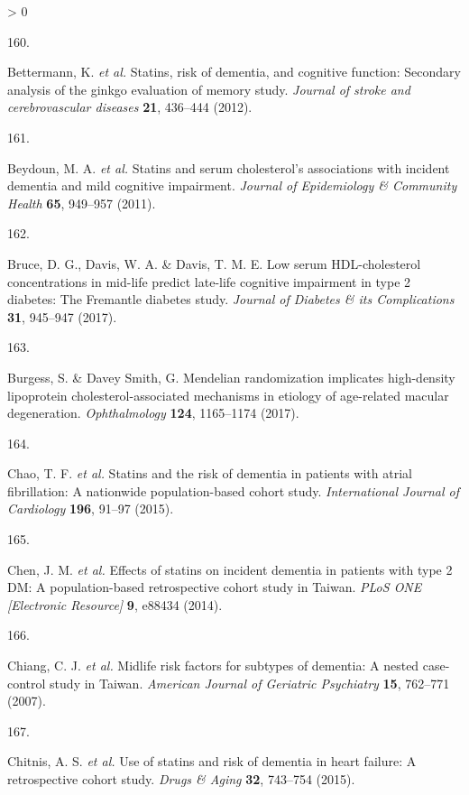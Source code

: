 \documentclass[a4paper, twoside]{templates/ociamthesis}
\newlength{\cslhangindent}
\newlength{\csllabelwidth}
\newenvironment{CSLReferences}[3] %
 {%
  \setlength{\parindent}{0pt}
  \ifodd #1 \everypar{\setlength{\hangindent}{\cslhangindent}}\ignorespaces\fi
  \ifnum #2 > 0
  \setlength{\parskip}{#2\baselineskip}
  \fi
 }%
 {}
\newcommand{\CSLLeftMargin}[1]{\parbox[t]{\maxof{\widthof{#1}}{\csllabelwidth}}{#1}}
\newcommand{\CSLRightInline}[1]{\parbox[t]{\linewidth - \csllabelwidth}{#1}}
\begin{document}
\begin{CSLReferences}{0}{0}
\leavevmode\hypertarget{ref-bettermann2012a}{}%
\CSLLeftMargin{160. }
\CSLRightInline{Bettermann, K. \emph{et al.} Statins, risk of dementia, and cognitive function: Secondary analysis of the ginkgo evaluation of memory study. \emph{Journal of stroke and cerebrovascular diseases} \textbf{21}, 436--444 (2012).}

\leavevmode\hypertarget{ref-beydoun2011}{}%
\CSLLeftMargin{161. }
\CSLRightInline{Beydoun, M. A. \emph{et al.} Statins and serum cholesterol's associations with incident dementia and mild cognitive impairment. \emph{Journal of Epidemiology \& Community Health} \textbf{65}, 949--957 (2011).}

\leavevmode\hypertarget{ref-bruce2017}{}%
\CSLLeftMargin{162. }
\CSLRightInline{Bruce, D. G., Davis, W. A. \& Davis, T. M. E. Low serum {HDL}-cholesterol concentrations in mid-life predict late-life cognitive impairment in type 2 diabetes: {The Fremantle} diabetes study. \emph{Journal of Diabetes \& its Complications} \textbf{31}, 945--947 (2017).}

\leavevmode\hypertarget{ref-burgess2017}{}%
\CSLLeftMargin{163. }
\CSLRightInline{Burgess, S. \& Davey Smith, G. Mendelian randomization implicates high-density lipoprotein cholesterol-associated mechanisms in etiology of age-related macular degeneration. \emph{Ophthalmology} \textbf{124}, 1165--1174 (2017).}

\leavevmode\hypertarget{ref-chao2015a}{}%
\CSLLeftMargin{164. }
\CSLRightInline{Chao, T. F. \emph{et al.} Statins and the risk of dementia in patients with atrial fibrillation: {A} nationwide population-based cohort study. \emph{International Journal of Cardiology} \textbf{196}, 91--97 (2015).}

\leavevmode\hypertarget{ref-chen2014}{}%
\CSLLeftMargin{165. }
\CSLRightInline{Chen, J. M. \emph{et al.} Effects of statins on incident dementia in patients with type 2 {DM}: A population-based retrospective cohort study in {Taiwan}. \emph{PLoS ONE {[}Electronic Resource{]}} \textbf{9}, e88434 (2014).}

\leavevmode\hypertarget{ref-chiang2007}{}%
\CSLLeftMargin{166. }
\CSLRightInline{Chiang, C. J. \emph{et al.} Midlife risk factors for subtypes of dementia: A nested case-control study in {Taiwan}. \emph{American Journal of Geriatric Psychiatry} \textbf{15}, 762--771 (2007).}

\leavevmode\hypertarget{ref-chitnis2015}{}%
\CSLLeftMargin{167. }
\CSLRightInline{Chitnis, A. S. \emph{et al.} Use of statins and risk of dementia in heart failure: {A} retrospective cohort study. \emph{Drugs \& Aging} \textbf{32}, 743--754 (2015).}


\end{CSLReferences}
\end{document}
